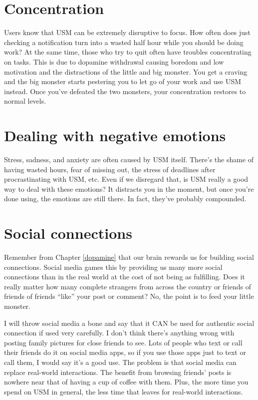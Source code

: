 \documentclass[
  openany]{book}
\begin{document}
\section{Concentration}\label{concentration}

Users know that USM can be extremely disruptive to focus. How often does just checking a notification turn into a wasted half hour while you should be doing work? At the same time, those who try to quit often have troubles concentrating on tasks. This is due to dopamine withdrawal causing boredom and low motivation and the distractions of the little and big monster. You get a craving and the big monster starts pestering you to let go of your work and use USM instead. Once you've defeated the two monsters, your concentration restores to normal levels.

\section{Dealing with negative emotions}\label{dealing-with-negative-emotions}

Stress, sadness, and anxiety are often caused by USM itself. There's the shame of having wasted hours, fear of missing out, the stress of deadlines after procrastinating with USM, etc. Even if we disregard that, is USM really a good way to deal with these emotions? It distracts you in the moment, but once you're done using, the emotions are still there. In fact, they've probably compounded.

\section{Social connections}\label{social-connections}

Remember from Chapter \ref{dopamine} that our brain rewards us for building social connections. Social media games this by providing us many more social connections than in the real world at the cost of not being as fulfilling. Does it really matter how many complete strangers from across the country or friends of friends of friends ``like'' your post or comment? No, the point is to feed your little monster.

I will throw social media a bone and say that it CAN be used for authentic social connection if used very carefully. I don't think there's anything wrong with posting family pictures for close friends to see. Lots of people who text or call their friends do it on social media apps, so if you use those apps just to text or call them, I would say it's a good use. The problem is that social media can replace real-world interactions. The benefit from browsing friends' posts is nowhere near that of having a cup of coffee with them. Plus, the more time you spend on USM in general, the less time that leaves for real-world interactions.
\end{document}
